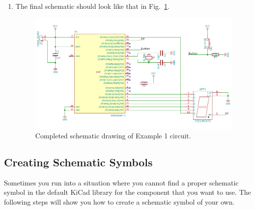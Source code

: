 \documentclass[12pt,letterpaper]{scrartcl}
\begin{document}
\begin{enumerate}
	\item The final schematic should look like that in Fig.~\ref{fig:example1-schematic-final}.
		\begin{figure}[h]
			\centering
			\includegraphics{example1-schematic-final}
			\caption{Completed schematic drawing of Example 1 circuit.}
			\label{fig:example1-schematic-final}
		\end{figure}		
\end{enumerate}

\newpage
\subsection{Creating Schematic Symbols}
Sometimes you run into a situation where you cannot find a proper schematic symbol in the default KiCad library for the component that you want to use. The following steps will show you how to create a schematic symbol of your own. 
\end{document}
